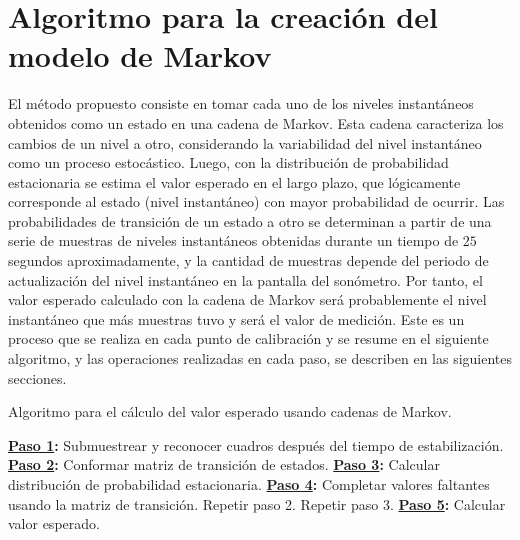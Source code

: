 \section*{Algoritmo para la creación del modelo de Markov}
El método propuesto consiste en tomar cada uno de los niveles instantáneos obtenidos como un estado en una cadena de Markov.
Esta cadena caracteriza los cambios de un nivel a otro, considerando la variabilidad del nivel instantáneo como un proceso estocástico.
Luego, con la distribución de probabilidad estacionaria se estima el valor esperado en el largo plazo, que lógicamente corresponde al estado (nivel instantáneo) con mayor probabilidad de ocurrir.
Las probabilidades de transición de un estado a otro se determinan a partir de una serie de muestras de niveles instantáneos obtenidas durante un tiempo de $25$ segundos aproximadamente, y la cantidad de muestras depende del periodo de actualización del nivel instantáneo en la pantalla del sonómetro.
Por tanto, el valor esperado calculado con la cadena de Markov será probablemente el nivel instantáneo que más muestras tuvo y será el valor de medición.
Este es un proceso que se realiza en cada punto de calibración y se resume en el siguiente algoritmo, y las operaciones realizadas en cada paso, se describen en las siguientes secciones.

\begin{algorithm}[H]
    \caption{Algoritmo para el cálculo del valor esperado usando cadenas de Markov.}
    \label{alg:markov_expected_value}
    \scriptsize
    \DontPrintSemicolon
    \BlankLine
    \textbf{\hyperref[sec:downsampling]{Paso 1}:} Submuestrear y reconocer cuadros después del tiempo de estabilización.\;
    \textbf{\hyperref[subsec:transition_matrix]{Paso 2}:} Conformar matriz de transición de estados.\;
    \textbf{\hyperref[subsec:stationary_distribution]{Paso 3}:} Calcular distribución de probabilidad estacionaria.\;
    \textbf{\hyperref[sec:fill_missing_values]{Paso 4}:} Completar valores faltantes usando la matriz de transición.\;
    Repetir paso 2.\;
    Repetir paso 3.\;
    \textbf{\hyperref[subsec:expected_value]{Paso 5}:} Calcular valor esperado.\;
\end{algorithm}

